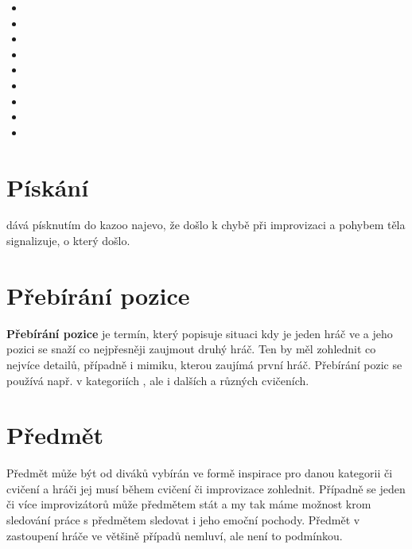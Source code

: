 \documentclass[main.tex]{subfiles}
\begin{document}
 
\label{:kategorie:porovnávací kategorie} 
\begin{multicols}{2}\begin{itemize} 
\item  {}  
\item  {}  
\item  {}  
\item  {}  
\item  {}  
\item  {}  
\item  {}  
\item  {}  
\item  {}  
\end{itemize} 
\end{multicols} 
\needspace{5cm} \section{Pískání} \label{pískání}  dává písknutím do kazoo najevo, že došlo k chybě při improvizaci a pohybem těla signalizuje, o který  došlo. 
 
 
\needspace{5cm} \section{Přebírání pozice} \label{přebírání pozice} \textbf{Přebírání pozice}{} je termín, který popisuje situaci kdy je jeden hráč ve  a jeho pozici se snaží co nejpřesněji zaujmout druhý hráč. Ten by měl zohlednit co nejvíce detailů, případně i mimiku, kterou zaujímá první hráč. Přebírání pozic se používá např. v kategoriích ,  ale i dalších a různých cvičeních. 
 
 
\needspace{5cm} \section{Předmět} \label{předmět} Předmět může být od diváků vybírán ve formě inspirace pro danou kategorii či cvičení a hráči jej musí během cvičení či improvizace zohlednit. Případně se jeden či více improvizátorů může předmětem stát a my tak máme možnost krom sledování práce s předmětem sledovat i jeho emoční pochody. Předmět v zastoupení hráče ve většině případů nemluví, ale není to podmínkou. 
 
\end{document}
